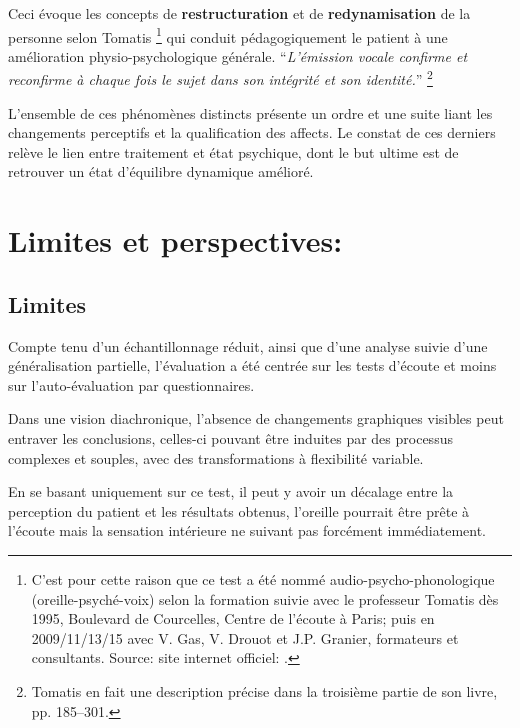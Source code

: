 Ceci évoque les concepts de \textbf{restructuration }et de
\textbf{redynamisation} de la personne selon Tomatis \footnote{C'est pour cette raison que ce test a été nommé
   audio-psycho-phonologique (oreille-psyché-voix) selon la formation
   suivie avec le professeur Tomatis dès 1995, Boulevard de Courcelles, Centre de l'écoute à Paris; puis en 2009/11/13/15 avec V. Gas, V. Drouot et
J.P. Granier, formateurs et consultants. Source: site internet
officiel: \cite{tomatis.com}.}
qui conduit pédagogiquement le patient à une amélioration physio-psychologique
générale. \enquote{\emph{L'émission vocale confirme et reconfirme à chaque
fois le sujet dans son intégrité et son identité.}}%
\autocite{tomatis:loreille}\footnote{Tomatis en fait une description précise dans la troisième partie de
son livre, pp. 185--301.}

L'ensemble de ces phénomènes distincts présente un ordre et une
suite liant les changements perceptifs et la qualification des
affects. Le constat de ces derniers relève le lien entre traitement et
état psychique, dont le but ultime est de retrouver
un état d'équilibre dynamique amélioré.


 







  \section{Limites et perspectives: }

\subsection{Limites}


  Compte tenu  d'un échantillonnage réduit, ainsi que d'une analyse
  suivie d'une généralisation partielle, l'évaluation a été centrée sur les
  tests d'écoute et moins sur
  l'auto-évaluation par questionnaires.

  Dans une vision diachronique, l'absence de changements graphiques
 visibles 
 peut  entraver les conclusions, celles-ci pouvant être 
 induites par des processus complexes et souples, avec des
 transformations à flexibilité variable.
 
En se basant uniquement sur ce test, il peut y avoir un décalage entre
la perception du patient et les résultats obtenus, l'oreille pourrait
être prête à l'écoute mais la sensation intérieure ne suivant pas
forcément immédiatement.


